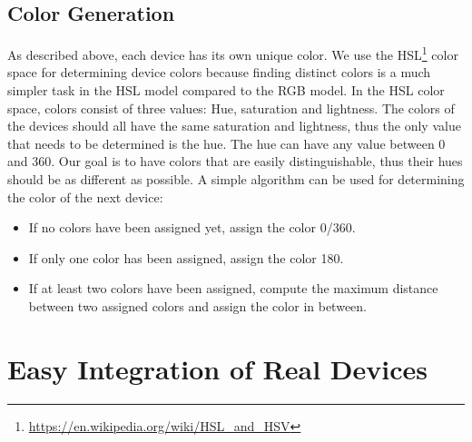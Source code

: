 \subsection{Color Generation}
As described above, each device has its own unique color. We use the HSL\footnote{\url{https://en.wikipedia.org/wiki/HSL_and_HSV}} color space for determining device colors because finding distinct colors is a much simpler task in the HSL model compared to the RGB model. In the HSL color space, colors consist of three values: Hue, saturation and lightness. The colors of the devices should all have the same saturation and lightness, thus the only value that needs to be determined is the hue. The hue can have any value between 0 and 360. Our goal is to have colors that are easily distinguishable, thus their hues should be as different as possible. A simple algorithm can be used for determining the color of the next device:
\begin{itemize}
	\item If no colors have been assigned yet, assign the color 0/360.
	\item If only one color has been assigned, assign the color 180.
	\item If at least two colors have been assigned, compute the maximum distance between two assigned colors and assign the color in between.
\end{itemize}

\section{Easy Integration of Real Devices}

